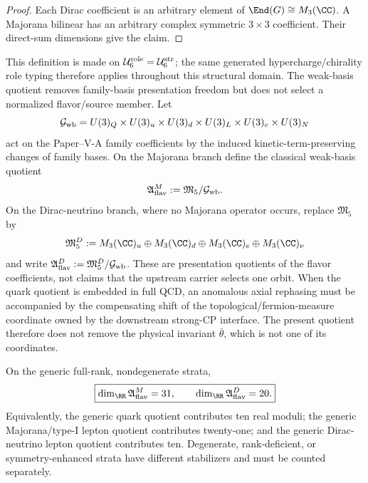 \documentclass[12pt,a4paper]{article}
\newcommand{\Ubase}{\mathcal U_6^{\rm str}}
\newcommand{\Urole}{\mathcal U_6^{\rm role}}
\begin{document}
\begin{proof}
Each Dirac coefficient is an arbitrary element of
\(\End(G)\cong M_3(\CC)\).  A Majorana bilinear has an arbitrary complex
symmetric \(3\times3\) coefficient.  Their direct-sum dimensions give the
claim.
\end{proof}

\begin{definition}
\label{p6:def:weak-basis-flavor-quotient}
This definition is made on \(\Urole=\Ubase\); the same generated
hypercharge/chirality role typing therefore applies throughout this structural
domain.  The weak-basis quotient removes family-basis presentation freedom but
does not select a normalized flavor/source member.  Let
\[
\mathcal G_{\rm wb}
=
U(3)_Q\times U(3)_u\times U(3)_d\times
U(3)_L\times U(3)_e\times U(3)_N
\]
act on the Paper--V-A family coefficients by the induced kinetic-term-preserving
changes of family bases.  On the Majorana branch define the classical
weak-basis quotient
\[
\mathfrak A_{\rm flav}^{M}
:=
\mathfrak M_5/\mathcal G_{\rm wb}.
\]
On the Dirac-neutrino branch, where no Majorana operator occurs, replace
\(\mathfrak M_5\) by
\[
\mathfrak M_5^{D}
:=
M_3(\CC)_u\oplus M_3(\CC)_d\oplus
M_3(\CC)_e\oplus M_3(\CC)_\nu
\]
and write
\(\mathfrak A_{\rm flav}^{D}:=
\mathfrak M_5^{D}/\mathcal G_{\rm wb}\).
These are presentation quotients of the flavor coefficients, not claims that
the upstream carrier selects one orbit.  When the quark quotient is embedded
in full QCD, an anomalous axial rephasing must be accompanied by the
compensating shift of the topological/fermion-measure coordinate owned by the
downstream strong-CP interface.  The present quotient therefore does not
remove the physical invariant \(\bar\theta\), which is not one of its
coordinates.
\end{definition}

\begin{theorem}
\label{p6:thm:weak-basis-flavor-dimensions}
On the generic full-rank, nondegenerate strata,
\[
\boxed{
\dim_{\RR}\mathfrak A_{\rm flav}^{M}=31,
\qquad
\dim_{\RR}\mathfrak A_{\rm flav}^{D}=20.
}
\]
Equivalently, the generic quark quotient contributes ten real moduli; the
generic Majorana/type-I lepton quotient contributes twenty-one; and the
generic Dirac-neutrino lepton quotient contributes ten.  Degenerate,
rank-deficient, or symmetry-enhanced strata have different stabilizers and
must be counted separately.
\end{theorem}
\end{document}
